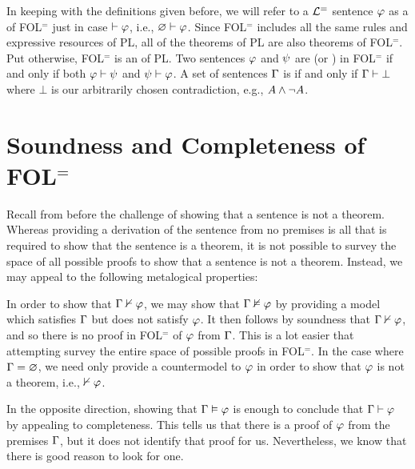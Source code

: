 In keeping with the definitions given before, we will refer to a $\mathcal{L}^{=}$ sentence $\varphi$ as a  of FOL$^=$ just in case $\vdash\varphi$, i.e., $\varnothing\vdash\varphi$.
Since FOL$^=$ includes all the same rules and expressive resources of PL, all of the theorems of PL are also theorems of FOL$^=$.
Put otherwise, FOL$^=$ is an  of PL.
Two sentences $\varphi$ and $\psi$ are  (or ) in FOL$^=$ if and only if both $\varphi\vdash\psi$ and $\psi\vdash\varphi$.
A set of sentences $\Gamma$ is  if and only if $\Gamma\vdash\bot$ where $\bot$ is our arbitrarily chosen contradiction, e.g., $A\wedge\neg A$.




\section{Soundness and Completeness of FOL$^=$}

Recall from before the challenge of showing that a sentence is not a theorem.
Whereas providing a derivation of the sentence from no premises is all that is required to show that the sentence is a theorem, it is not possible to survey the space of all possible proofs to show that a sentence is not a theorem.
Instead, we may appeal to the following metalogical properties:

\vspace{-.4in}

In order to show that $\Gamma \nvdash \varphi$, we may show that $\Gamma \nvDash \varphi$ by providing a model which satisfies $\Gamma$ but does not satisfy $\varphi$.
It then follows by soundness that $\Gamma \nvdash \varphi$, and so there is no proof in FOL$^=$ of $\varphi$ from $\Gamma$.
This is a lot easier that attempting survey the entire space of possible proofs in FOL$^=$.
In the case where $\Gamma=\varnothing$, we need only provide a countermodel to $\varphi$ in order to show that $\varphi$ is not a theorem, i.e., $\nvdash \varphi$.

In the opposite direction, showing that $\Gamma \vDash \varphi$ is enough to conclude that $\Gamma \vdash \varphi$ by appealing to completeness.
This tells us that there is a proof of $\varphi$ from the premises $\Gamma$, but it does not identify that proof for us.
Nevertheless, we know that there is good reason to look for one.

